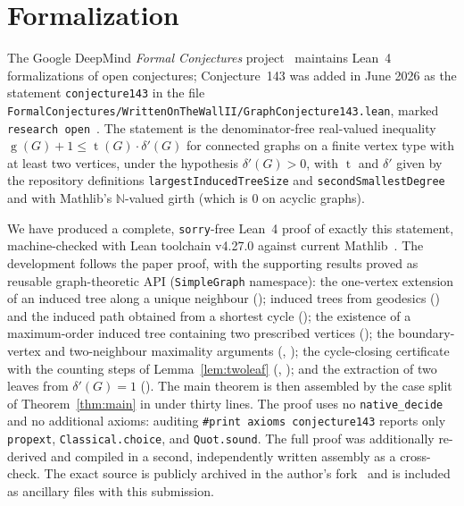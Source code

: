 \documentclass[11pt]{article}
\numberwithin{equation}{section}
\theoremstyle{remark}
\newcommand{\tr}{\operatorname{t}}
\newcommand{\gr}{\operatorname{g}}
\newcommand{\dd}{\delta'}
\begin{document}
\section{Formalization}\label{sec:formal}

The Google DeepMind \emph{Formal Conjectures} project~\cite{FC} maintains
Lean~4 formalizations of open conjectures; Conjecture~143 was added in June
2026 as the statement \texttt{conjecture143} in the file
\texttt{FormalConjectures/WrittenOnTheWallII/GraphConjecture143.lean},
marked \texttt{research open}~\cite{FC143}.  The statement is the
denominator-free real-valued inequality
$\gr(G)+1\le\tr(G)\cdot\dd(G)$ for connected graphs on a finite
vertex type with at least two vertices, under the hypothesis $\dd(G)>0$, with
$\tr$ and $\dd$ given by the repository definitions
\texttt{largestInducedTreeSize} and \texttt{secondSmallestDegree} and with
Mathlib's $\mathbb{N}$-valued girth (which is $0$ on acyclic graphs).

\begin{sloppypar}
We have produced a complete, \texttt{sorry}-free Lean~4 proof of exactly this
statement, machine-checked with Lean toolchain v4.27.0 against current
Mathlib~\cite{mathlib}.  The development follows the paper proof, with the
supporting results proved as reusable graph-theoretic API
(\texttt{SimpleGraph} namespace): the one-vertex extension of an induced tree
along a unique neighbour ();
induced trees from geodesics
() and the induced
path obtained from a shortest cycle
(); the existence of a
maximum-order induced tree containing two prescribed vertices
(); the boundary-vertex and
two-neighbour maximality arguments
(,
); the
cycle-closing certificate with the counting steps of Lemma~\ref{lem:twoleaf}
(,
); and the
extraction of two leaves from $\dd(G)=1$
().
The main theorem is then assembled by the case split of
Theorem~\ref{thm:main} in under thirty lines.  The proof uses no
\texttt{native\_decide} and no additional axioms: auditing
\texttt{\#print axioms conjecture143} reports only \texttt{propext},
\texttt{Classical.choice}, and \texttt{Quot.sound}.  The full proof was
additionally re-derived and compiled in a second, independently written
assembly as a cross-check.  The exact source is publicly archived in the
author's fork~\cite{OurLean} and is included as ancillary files with this
submission.
\end{sloppypar}
\end{document}
